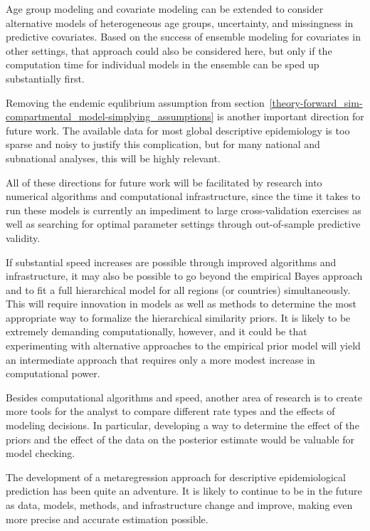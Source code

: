 Age group modeling and covariate modeling can be extended to consider
alternative models of heterogeneous age groups, uncertainty, and
missingness in predictive covariates.  Based on the success of
ensemble modeling for covariates in other settings, that approach
could also be considered here, but only if the computation time for
individual models in the ensemble can be sped up substantially first.

Removing the endemic equlibrium assumption from
section~\ref{theory-forward_sim-compartmental_model-simplying_assumptions}
is another important direction for future work.  The available data
for most global descriptive epidemiology is too sparse and noisy to justify
this complication, but for many national and subnational analyses,
this will be highly relevant.


All of these directions for future work will be facilitated by
research into numerical algorithms and computational infrastructure,
since the time it takes to run these models is currently an impediment
to large cross-validation exercises as well as searching for optimal
parameter settings through out-of-sample predictive validity.

If substantial speed increases are possible through improved algorithms and
infrastructure, it may also be possible to go beyond the empirical Bayes
approach and to fit a full hierarchical model for all regions (or
countries) simultaneously.  This will require innovation in models as
well as methods to determine the most appropriate way to formalize the
hierarchical similarity priors.  It is likely to be extremely
demanding computationally, however, and it could be that experimenting
with alternative approaches to the empirical prior model will yield an
intermediate approach that requires only a more modest increase in
computational power.





Besides computational algorithms and speed, another area of research
is to create more tools for the analyst to compare different rate
types and the effects of modeling decisions.  In particular,
developing a way to determine the effect of the priors and the effect
of the data on the posterior estimate would be valuable for model
checking.

The development of a metaregression approach for descriptive
epidemiological prediction has been quite an adventure.  It is likely
to continue to be in the future as data, models, methods, and
infrastructure change and improve, making even more precise and
accurate estimation possible.
